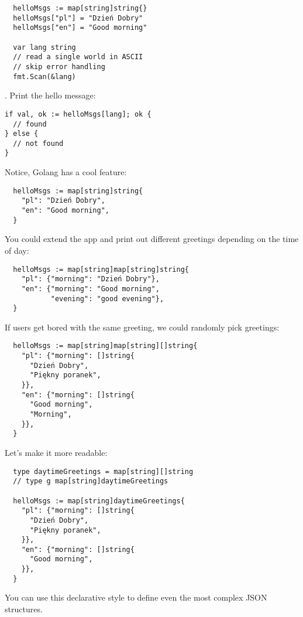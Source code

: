 \documentclass[11pt, letterpaper]{article}
\begin{document}
\begin{verbatim}
  helloMsgs := map[string]string{}
  helloMsgs["pl"] = "Dzień Dobry"
  helloMsgs["en"] = "Good morning"

  var lang string
  // read a single world in ASCII
  // skip error handling
  fmt.Scan(&lang)
\end{verbatim}

. Print the hello message:

\begin{verbatim}
if val, ok := helloMsgs[lang]; ok {
  // found
} else {
  // not found
}
\end{verbatim}

\bigskip
Notice, Golang has a cool feature:

\begin{verbatim}
  helloMsgs := map[string]string{
    "pl": "Dzień Dobry",
    "en": "Good morning",
  }
\end{verbatim}

You could extend the app and print out different greetings depending on the time of day:

\begin{verbatim}
  helloMsgs := map[string]map[string]string{
    "pl": {"morning": "Dzień Dobry"},
    "en": {"morning": "Good morning", 
           "evening": "good evening"},
  }
\end{verbatim}

If users get bored with the same greeting, we could randomly pick greetings:

\begin{verbatim}
  helloMsgs := map[string]map[string][]string{
    "pl": {"morning": []string{
      "Dzień Dobry",
      "Piękny poranek",
    }},
    "en": {"morning": []string{
      "Good morning",
      "Morning",
    }},
  }
\end{verbatim}

Let's make it more readable:

\begin{verbatim}
  type daytimeGreetings = map[string][]string
  // type g map[string]daytimeGreetings

  helloMsgs := map[string]daytimeGreetings{
    "pl": {"morning": []string{
      "Dzień Dobry",
      "Piękny poranek",
    }},
    "en": {"morning": []string{
      "Good morning",
    }},
  }
\end{verbatim}

You can use this declarative style to define even the most complex {\small JSON} structures.
\end{document}
